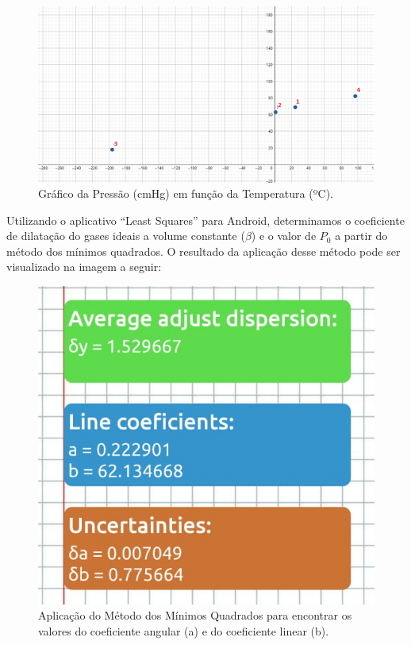 \begin{figure}[H]
  \centering
  \includegraphics[scale=0.5]{images/Gráfico 1 - experimento 3.png}
  \caption{Gráfico da Pressão (cmHg) em função da Temperatura (ºC).}
\end{figure}

Utilizando o aplicativo “Least Squares” para Android, determinamos o coeficiente de dilatação do gases ideais a volume constante ($\beta$) e o valor de $P_0$ a partir do método dos mínimos quadrados. O resultado da aplicação desse método pode ser visualizado na imagem a seguir:

\begin{figure}[H]
  \centering
  \includegraphics[scale=0.6]{images/Gráfico 2 - experimento 3.png}
  \caption{Aplicação do Método dos Mínimos Quadrados para encontrar os valores do coeficiente angular (a) e do coeficiente linear (b).}
\end{figure}

